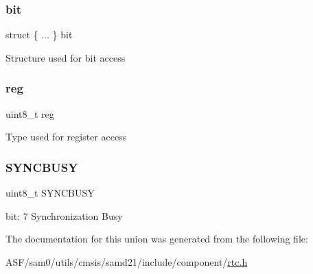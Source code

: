 \subsubsection{\texorpdfstring{bit}{bit}}
{\footnotesize\ttfamily struct \{ ... \}   bit}

Structure used for bit access \mbox{\label{union_r_t_c___s_t_a_t_u_s___type_a9428adc9af4653a2050e2536b55dec8d}} 
\subsubsection{\texorpdfstring{reg}{reg}}
{\footnotesize\ttfamily uint8\+\_\+t reg}

Type used for register access \mbox{\label{union_r_t_c___s_t_a_t_u_s___type_abb30254758e23bd24824e436a1aa8716}} 
\subsubsection{\texorpdfstring{SYNCBUSY}{SYNCBUSY}}
{\footnotesize\ttfamily uint8\+\_\+t S\+Y\+N\+C\+B\+U\+SY}

bit\+: 7 Synchronization Busy 

The documentation for this union was generated from the following file\+:\begin{DoxyCompactItemize}
\item 
A\+S\+F/sam0/utils/cmsis/samd21/include/component/\mbox{\hyperlink{component_2rtc_8h}{rtc.\+h}}\end{DoxyCompactItemize}
